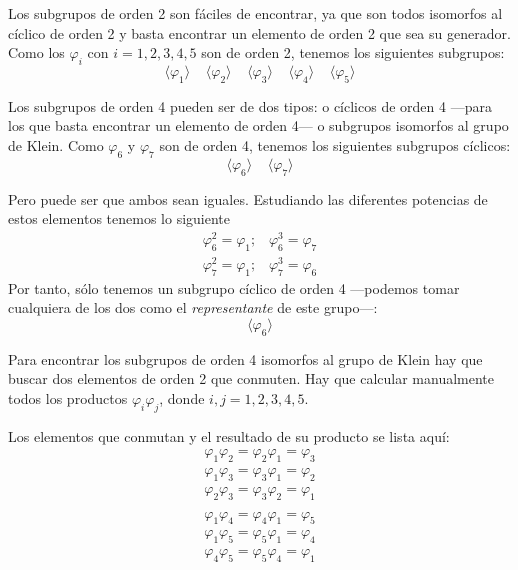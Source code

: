 \documentclass[a4paper, 11pt]{article}
\begin{document}
\begin{solucion}
      Los subgrupos de orden 2 son fáciles de encontrar, ya que son todos isomorfos al cíclico de orden 2 y basta encontrar un elemento de orden 2 que sea su generador. Como los $\varphi_i$ con $i=1,2,3,4,5$ son de orden 2, tenemos los siguientes subgrupos:
      \[
      \langle\varphi_1\rangle \;\;\;\; \langle\varphi_2\rangle \;\;\;\; \langle\varphi_3\rangle \;\;\;\; \langle\varphi_4\rangle \;\;\;\; \langle\varphi_5\rangle
      \]

      Los subgrupos de orden 4 pueden ser de dos tipos: o cíclicos de orden 4 ---para los que basta encontrar un elemento de orden 4--- o subgrupos isomorfos al grupo de Klein. Como $\varphi_6$ y $\varphi_7$ son de orden 4, tenemos los siguientes subgrupos cíclicos:
      \[
      \langle\varphi_6\rangle \;\;\;\; \langle\varphi_7\rangle
      \]

      Pero puede ser que ambos sean iguales. Estudiando las diferentes potencias de estos elementos tenemos lo siguiente
      \begin{align*}
          \varphi_6^2 = \varphi_1; \;\;\; \varphi_6^3 = \varphi_7 \\
          \varphi_7^2 = \varphi_1; \;\;\; \varphi_7^3 = \varphi_6
      \end{align*}
      Por tanto, sólo tenemos un subgrupo cíclico de orden 4 ---podemos tomar cualquiera de los dos como el \emph{representante} de este grupo---:
      \[
      \langle\varphi_6\rangle
      \]

      Para encontrar los subgrupos de orden 4 isomorfos al grupo de Klein hay que buscar dos elementos de orden 2 que conmuten. Hay que calcular manualmente todos los productos $\varphi_i\varphi_j$, donde $i,j=1,2,3,4,5$.

      Los elementos que conmutan y el resultado de su producto se lista aquí:
      \begin{align*}
          \varphi_1\varphi_2 = \varphi_2\varphi_1 = \varphi_3 \\
          \varphi_1\varphi_3 = \varphi_3\varphi_1 = \varphi_2 \\
          \varphi_2\varphi_3 = \varphi_3\varphi_2 = \varphi_1 \\
          \\
          \varphi_1\varphi_4 = \varphi_4\varphi_1 = \varphi_5 \\
          \varphi_1\varphi_5 = \varphi_5\varphi_1 = \varphi_4 \\
          \varphi_4\varphi_5 = \varphi_5\varphi_4 = \varphi_1
      \end{align*}


\end{solucion}
\end{document}
